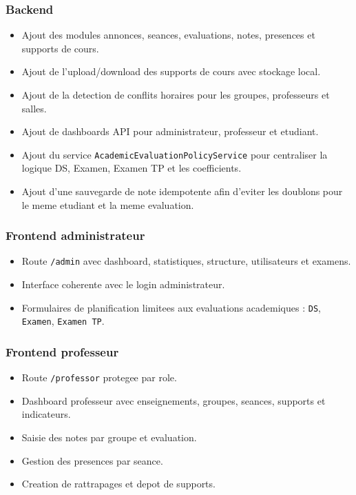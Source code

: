 \documentclass[12pt,a4paper]{report}
\begin{document}
\subsubsection{Backend}

\begin{itemize}[itemsep=0.3em]
    \item Ajout des modules annonces, seances, evaluations, notes, presences et supports de cours.
    \item Ajout de l'upload/download des supports de cours avec stockage local.
    \item Ajout de la detection de conflits horaires pour les groupes, professeurs et salles.
    \item Ajout de dashboards API pour administrateur, professeur et etudiant.
    \item Ajout du service \texttt{AcademicEvaluationPolicyService} pour centraliser la logique DS, Examen, Examen TP et les coefficients.
    \item Ajout d'une sauvegarde de note idempotente afin d'eviter les doublons pour le meme etudiant et la meme evaluation.
\end{itemize}

\subsubsection{Frontend administrateur}

\begin{itemize}[itemsep=0.3em]
    \item Route \texttt{/admin} avec dashboard, statistiques, structure, utilisateurs et examens.
    \item Interface coherente avec le login administrateur.
    \item Formulaires de planification limitees aux evaluations academiques : \texttt{DS}, \texttt{Examen}, \texttt{Examen TP}.
\end{itemize}

\subsubsection{Frontend professeur}

\begin{itemize}[itemsep=0.3em]
    \item Route \texttt{/professor} protegee par role.
    \item Dashboard professeur avec enseignements, groupes, seances, supports et indicateurs.
    \item Saisie des notes par groupe et evaluation.
    \item Gestion des presences par seance.
    \item Creation de rattrapages et depot de supports.
\end{itemize}
\end{document}

